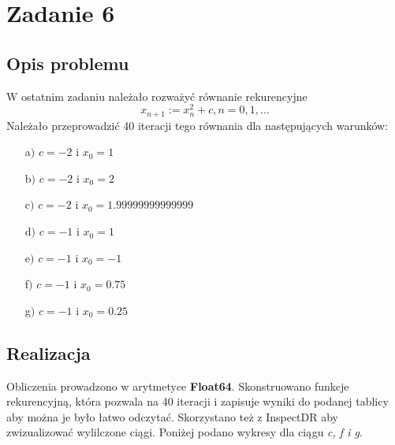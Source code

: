 \documentclass[]{article}
\begin{document}
\section{Zadanie 6}
\subsection{Opis problemu}
W ostatnim zadaniu należało rozważyć równanie rekurencyjne \[x_{n+1} := x^2_n + c, n = 0, 1, ...\]
Należało przeprowadzić 40 iteracji tego równania dla następujących warunków:
\begin{itemize}
	\item[a$)$] $c = -2$ i $x_0 = 1$
	\item[b$)$] $c = -2$ i $x_0 = 2$
	\item[c$)$] $c = -2$ i $x_0 = 1.99999999999999$
	\item[d$)$] $c = -1$ i $x_0 = 1$
	\item[e$)$] $c = -1$ i $x_0 = -1$
	\item[f$)$] $c = -1$ i $x_0 = 0.75$
	\item[g$)$] $c = -1$ i $x_0 = 0.25$
\end{itemize}

\subsection{Realizacja}
Obliczenia prowadzono w arytmetyce \textbf{Float64}. Skonstruowano funkcje rekurencyjną, która pozwala na 40 iteracji i zapisuje wyniki do podanej tablicy aby można je było łatwo odczytać. Skorzystano też z InspectDR aby zwizualizować wylilczone ciągi. Poniżej podano wykresy dla ciągu \textit{c, f i g}.
\newpage
\end{document}
